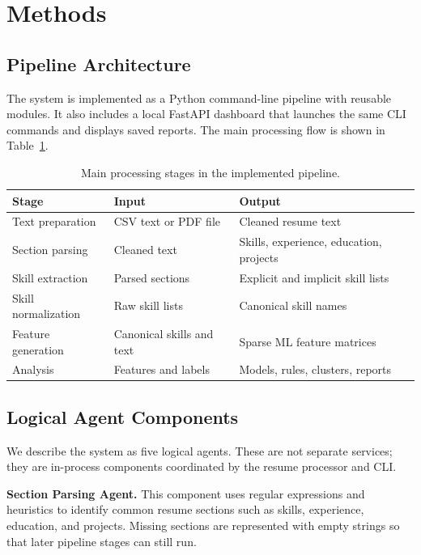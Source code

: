 \documentclass[sigconf, authorversion, nonacm]{acmart}
\begin{document}
\section{Methods}
\label{sec:methods}

\subsection{Pipeline Architecture}

The system is implemented as a Python command-line pipeline with reusable modules. It also includes a local FastAPI dashboard that launches the same CLI commands and displays saved reports. The main processing flow is shown in Table~\ref{tab:method-pipeline}.

\begin{table}[t]
  \centering
  \caption{Main processing stages in the implemented pipeline.}
  \label{tab:method-pipeline}
  \small
  \setlength{\tabcolsep}{3pt}
  \begin{tabular}{p{}p{}p{}}
    \toprule
    \textbf{Stage} & \textbf{Input} & \textbf{Output} \\
    \midrule
    Text preparation & CSV text or PDF file & Cleaned resume text \\
    Section parsing & Cleaned text & Skills, experience, education, projects \\
    Skill extraction & Parsed sections & Explicit and implicit skill lists \\
    Skill normalization & Raw skill lists & Canonical skill names \\
    Feature generation & Canonical skills and text & Sparse ML feature matrices \\
    Analysis & Features and labels & Models, rules, clusters, reports \\
    \bottomrule
  \end{tabular}
\end{table}

\subsection{Logical Agent Components}

We describe the system as five logical agents. These are not separate services; they are in-process components coordinated by the resume processor and CLI.

\textbf{Section Parsing Agent.} This component uses regular expressions and heuristics to identify common resume sections such as skills, experience, education, and projects. Missing sections are represented with empty strings so that later pipeline stages can still run.
\end{document}
